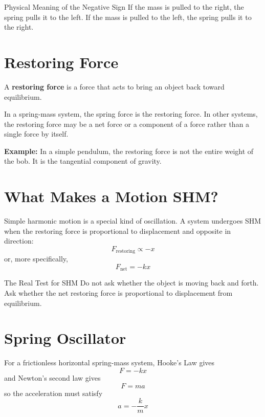 \begin{keyidea}{Physical Meaning of the Negative Sign}
If the mass is pulled to the right, the spring pulls it to the left. If the mass is pulled to the left, the spring pulls it to the right.
\end{keyidea}

\section{Restoring Force}
A \textbf{restoring force} is a force that acts to bring an object back toward equilibrium.

In a spring-mass system, the spring force is the restoring force. In other systems, the restoring force may be a net force or a component of a force rather than a single force by itself.

\textbf{Example:} In a simple pendulum, the restoring force is not the entire weight of the bob. It is the tangential component of gravity.

\section{What Makes a Motion SHM?}
Simple harmonic motion is a special kind of oscillation. A system undergoes SHM when the restoring force is proportional to displacement and opposite in direction:
\begin{equation}
    F_{\text{restoring}} \propto -x
\end{equation}
or, more specifically,
\begin{equation}
    F_{\text{net}} = -kx
\end{equation}

\begin{keyidea}{The Real Test for SHM}
Do not ask whether the object is moving back and forth. Ask whether the net restoring force is proportional to displacement from equilibrium.
\end{keyidea}

\section{Spring Oscillator}
For a frictionless horizontal spring-mass system, Hooke's Law gives
\begin{equation}
    F = -kx
\end{equation}
and Newton's second law gives
\begin{equation}
    F = ma
\end{equation}
so the acceleration must satisfy
\begin{equation}
    a = -\frac{k}{m}x
\end{equation}

